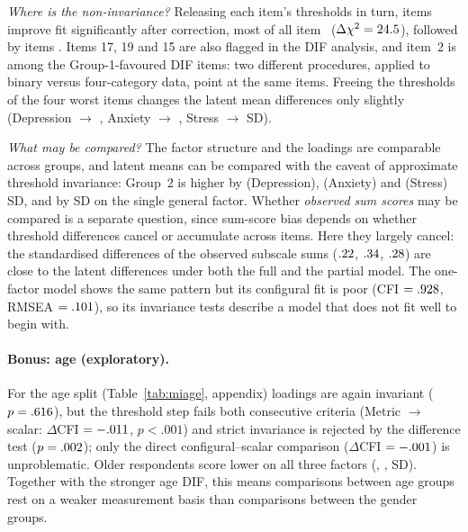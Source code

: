 \documentclass[11pt,a4paper]{article}
\newcommand{\itemno}[1]{item~#1}
\begin{document}
\emph{Where is the non-invariance?} Releasing each item's thresholds in turn,
\PartialNSigBH{} items improve fit significantly after correction, most of all
\itemno{\PartialTopItem} ($\Delta\chi^2=24.5$), followed by items
\PartialItems. Items 17, 19 and 15 are also flagged in the DIF analysis, and \itemno{2}
is among the Group-1-favoured DIF items: two different procedures, applied to binary
versus four-category data, point at the same items. Freeing the thresholds of the four
worst items changes the latent mean differences only slightly (Depression \KappaDepression{}
$\rightarrow$ \KappaPartialDepression, Anxiety \KappaAnxiety{} $\rightarrow$
\KappaPartialAnxiety, Stress \KappaStress{} $\rightarrow$ \KappaPartialStress{} SD).

\emph{What may be compared?} The factor structure and the loadings are comparable
across groups, and latent means can be compared with the caveat of approximate threshold
invariance: Group~2 is higher by \KappaDepression{} (Depression), \KappaAnxiety{} (Anxiety)
and \KappaStress{} (Stress) SD, and by \KappaUni{} SD on the single general factor. Whether
\emph{observed sum scores} may be compared is a separate question, since sum-score bias
depends on whether threshold differences cancel or accumulate across items. Here they
largely cancel: the standardised differences of the observed subscale sums
($.22$, $.34$, $.28$) are close to the latent differences under
both the full and the partial model. The one-factor model shows the same pattern but its
configural fit is poor (CFI $=.928$, RMSEA $=.101$), so its
invariance tests describe a model that does not fit well to begin with.

\paragraph{Bonus: age (exploratory).} For the age split (Table~\ref{tab:miage},
appendix) loadings are again invariant ($p=.616$), but the threshold step fails
both consecutive criteria (Metric $\rightarrow$ scalar: $\Delta$CFI
$=-.011$, $p<.001$) and strict invariance is rejected by the difference test
($p=.002$); only the direct configural--scalar comparison
($\Delta$CFI $=-.001$) is unproblematic. Older respondents score lower on
all three factors (\KappaAgeDepression, \KappaAgeAnxiety, \KappaAgeStress{} SD). Together
with the stronger age DIF, this means comparisons between age groups rest on a weaker
measurement basis than comparisons between the gender groups.
\end{document}
